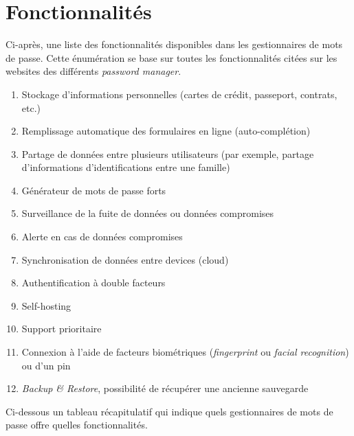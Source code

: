 \section{Fonctionnalités}
Ci-après, une liste des fonctionnalités disponibles dans les gestionnaires de mots de passe. Cette énumération se base sur toutes les fonctionnalités citées sur les websites des différents \textit{password manager}. \\
\begin{enumerate}
\item Stockage d'informations personnelles (cartes de crédit, passeport, contrats, etc.)
\item Remplissage automatique des formulaires en ligne (auto-complétion)
\item Partage de données entre plusieurs utilisateurs (par exemple, partage d'informations d'identifications entre une famille)
\item Générateur de mots de passe forts
\item Surveillance de la fuite de données ou données compromises
\item Alerte en cas de données compromises
\item Synchronisation de données entre devices (cloud)
\item Authentification à double facteurs
\item Self-hosting
\item Support prioritaire
\item Connexion à l'aide de facteurs biométriques (\textit{fingerprint} ou \textit{facial recognition}) ou d'un pin
\item \textit{Backup \& Restore}, possibilité de récupérer une ancienne sauvegarde

\end{enumerate}
Ci-dessous un tableau récapitulatif qui indique quels gestionnaires de mots de passe offre quelles fonctionnalités. 
